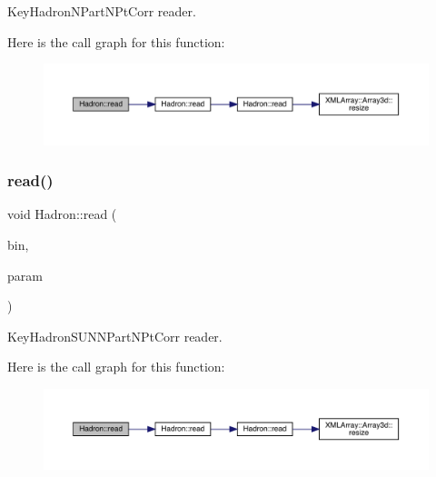 Key\+Hadron\+N\+Part\+N\+Pt\+Corr reader. 

Here is the call graph for this function\+:
\nopagebreak
\begin{figure}[H]
\begin{center}
\leavevmode
\includegraphics[width=350pt]{d1/daf/namespaceHadron_a9478eee791b9cb2c8523893a334602e2_cgraph}
\end{center}
\end{figure}
\mbox{\label{namespaceHadron_a475e00d642e0578e7bbe956bbbf37aac}} 
\subsubsection{\texorpdfstring{read()}{read()}\hspace{0.1cm}{\footnotesize\ttfamily [53/94]}}
{\footnotesize\ttfamily void Hadron\+::read (\begin{DoxyParamCaption}\item[{\mbox{\hyperlink{classADATIO_1_1BinaryReader}{Binary\+Reader}} \&}]{bin,  }\item[{\mbox{\hyperlink{structHadron_1_1KeyHadronSUNNPartNPtCorr__t}{Key\+Hadron\+S\+U\+N\+N\+Part\+N\+Pt\+Corr\+\_\+t}} \&}]{param }\end{DoxyParamCaption})}



Key\+Hadron\+S\+U\+N\+N\+Part\+N\+Pt\+Corr reader. 

Here is the call graph for this function\+:
\nopagebreak
\begin{figure}[H]
\begin{center}
\leavevmode
\includegraphics[width=350pt]{d1/daf/namespaceHadron_a475e00d642e0578e7bbe956bbbf37aac_cgraph}
\end{center}
\end{figure}
\mbox{\label{namespaceHadron_a60758467521910899dec197e7fbc0ab4}} 
